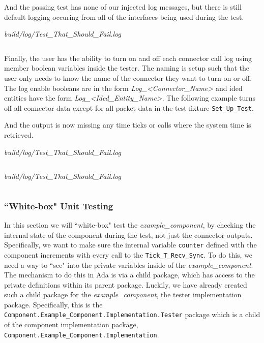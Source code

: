 And the passing test has none of our injected log messages, but there is still default logging occuring from all of the interfaces being used during the test.

\vspace{5mm} %
\textit{build/log/Test\_That\_Should\_Fail.log}
\inputminted{text}{../example_architecture/example_component/test4/build/log/Test_That_Should_Pass.log}
\vspace{5mm} %

Finally, the user has the ability to turn on and off each connector call log using member boolean variables inside the tester. The naming is setup such that the user only needs to know the name of the connector they want to turn on or off. The log enable booleans are in the form \textit{Log\_<Connector\_Name>} and ided entities have the form \textit{Log\_<Ided\_Entity\_Name>}. The following example turns off all connector data except for all packet data in the test fixture \texttt{Set\_Up\_Test}.


And the output is now missing any time ticks or calls where the system time is retrieved.

\vspace{5mm} %
\textit{build/log/Test\_That\_Should\_Fail.log}
\inputminted{text}{../example_architecture/example_component/test5/build/log/Test_That_Should_Fail.log}
\vspace{5mm} %

\vspace{5mm} %
\textit{build/log/Test\_That\_Should\_Fail.log}
\inputminted{text}{../example_architecture/example_component/test5/build/log/Test_That_Should_Pass.log}
\vspace{5mm} %

\subsubsection{``White-box" Unit Testing} \label{White-box Unit Testing Component}

In this section we will ``white-box" test the \textit{example\_component}, by checking the internal state of the component during the test, not just the connector outputs. Specifically, we want to make sure the internal variable \texttt{counter} defined with the component increments with every call to the \texttt{Tick\_T\_Recv\_Sync}. To do this, we need a way to ``see" into the private variables inside of the \textit{example\_component}. The mechanism to do this in Ada is via a child package, which has access to the private definitions within its parent package. Luckily, we have already created such a child package for the \textit{example\_component}, the tester implementation package. Specifically, this is the \texttt{Component.Example\_Component.Implementation.Tester} package which is a child of the component implementation package, \texttt{Component.Example\_Component.Implementation}. \\

